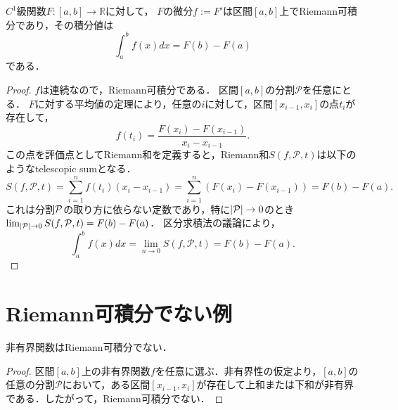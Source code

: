\begin{theorem}[微分積分学の第二基本定理]
$C^1$級関数$F:[a,b] \to \mathbb{R}$に対して，
    $F$の微分$f := F'$は区間$[a,b]$上でRiemann可積分であり，その積分値は
    \[
    \int_a^b f(x) dx = F(b) - F(a)
    \]
    である．
\end{theorem}
\begin{proof}
    $f$は連続なので，Riemann可積分である．
    区間$[a,b]$の分割$\mathcal{P}$を任意にとる．
    $F$に対する平均値の定理により，任意の$i$に対して，区間$[x_{i-1}, x_i]$の点$t_i$が存在して，
\[
f(t_i) = \frac{F(x_i) - F(x_{i-1})}{x_i - x_{i-1}}.
\]
この点を評価点としてRiemann和を定義すると，Riemann和$S(f,\mathcal{P},t)$は以下のようなtelescopic sumとなる．
\[
S(f,\mathcal{P},t) = \sum_{i=1}^n f(t_i)(x_i - x_{i-1}) = \sum_{i=1}^n (F(x_i) - F(x_{i-1})) = F(b) - F(a).
\]
これは分割$\mathcal P$の取り方に依らない定数であり，特に$|\mathcal P| \to 0$のとき$\lim_{|\mathcal P| \to 0} S(f,\mathcal P,t) = F(b)-F(a)$．
区分求積法の議論により，
\[
\int_a^b f(x) dx = 
\lim_{n \to 0} S(f,\mathcal{P},t) 
=F(b) - F(a).
\]
\end{proof}


\section{Riemann可積分でない例}

\begin{example}
    非有界関数はRiemann可積分でない．
\end{example}
\begin{proof}
    区間$[a,b]$上の非有界関数$f$を任意に選ぶ．非有界性の仮定より，$[a,b]$の任意の分割$\mathcal{P}$において，ある区間$[x_{i-1}, x_i]$が存在して上和または下和が非有界である．したがって，Riemann可積分でない．
\end{proof}

